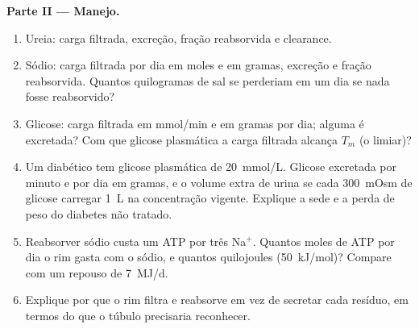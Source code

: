 \begin{problem}
\medskip
\noindent\textbf{Parte II --- Manejo.}
\begin{enumerate}[resume]
  \item Ureia: carga filtrada, excreção, fração reabsorvida e clearance.
  \item Sódio: carga filtrada por dia em moles e em gramas, excreção e
        fração reabsorvida. Quantos quilogramas de sal se perderiam em um
        dia se nada fosse reabsorvido?
  \item Glicose: carga filtrada em mmol/min e em gramas por dia; alguma
        é excretada? Com que glicose plasmática a carga filtrada alcança
        $T_{m}$ (o limiar)?
  \item Um diabético tem glicose plasmática de \qty{20}{mmol/L}. Glicose
        excretada por minuto e por dia em gramas, e o volume extra de
        urina se cada \qty{300}{mOsm} de glicose carregar \qty{1}{L} na
        concentração vigente. Explique a sede e a perda de peso do
        diabetes não tratado.
  \item Reabsorver sódio custa um ATP por três Na$^{+}$. Quantos moles de
        ATP por dia o rim gasta com o sódio, e quantos quilojoules
        (\qty{50}{kJ/mol})? Compare com um repouso de \qty{7}{MJ/d}.
  \item Explique por que o rim filtra e reabsorve em vez de secretar cada
        resíduo, em termos do que o túbulo precisaria reconhecer.
\end{enumerate}


\end{problem}
